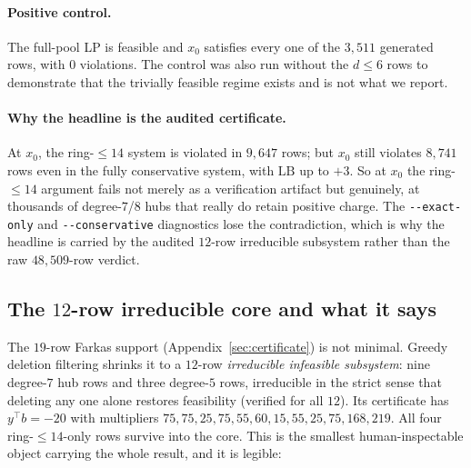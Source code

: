 \documentclass[11pt]{article}
\theoremstyle{definition}
\begin{document}
\paragraph{Positive control.} The full-pool LP is feasible and $x_0$ satisfies every
one of the $3{,}511$ generated rows, with $0$ violations. The control was also run
without the $d\le 6$ rows to demonstrate that the trivially feasible regime exists
and is not what we report.

\paragraph{Why the headline is the audited certificate.} At $x_0$, the ring-$\le14$
system is violated in $9{,}647$ rows; but $x_0$ still violates $8{,}741$ rows even in
the fully conservative system, with $\mathrm{LB}$ up to $+3$. So at $x_0$ the
ring-$\le 14$ argument fails not merely as a verification artifact but genuinely, at
thousands of degree-$7$/$8$ hubs that really do retain positive charge. The
\texttt{-{}-exact-only} and \texttt{-{}-conservative} diagnostics lose the
contradiction, which is why the headline is carried by the audited $12$-row
irreducible subsystem rather than the raw $48{,}509$-row verdict.

\subsection{The $12$-row irreducible core and what it says}

The $19$-row Farkas support (Appendix~\ref{sec:certificate}) is not minimal. Greedy
deletion filtering shrinks it to a $12$-row \emph{irreducible infeasible subsystem}:
nine degree-$7$ hub rows and three degree-$5$ rows, irreducible in the strict sense
that deleting any one alone restores feasibility (verified for all $12$). Its
certificate has $y^\top b = -20$ with multipliers
$75, 75, 25, 75, 55, 60, 15, 55, 25, 75, 168, 219$. All four ring-$\le14$-only rows
survive into the core. This is the smallest human-inspectable object carrying the
whole result, and it is legible:
\end{document}
